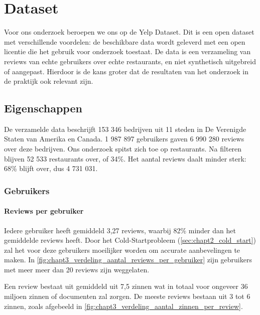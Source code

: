 \chapter{Dataset}

Voor ons onderzoek beroepen we ons op de Yelp Dataset. Dit is een open dataset met verschillende voordelen: de beschikbare data wordt geleverd met een open licentie die het gebruik voor onderzoek toestaat. \cite{Yelp_Dataset} De data is een verzameling van reviews van echte gebruikers over echte restaurants, en niet synthetisch uitgebreid of aangepast. Hierdoor is de kans groter dat de resultaten van het onderzoek in de praktijk ook relevant zijn.

\section{Eigenschappen}
\label{sub:chapt3_eigenschappen_dataset}
De verzamelde data beschrijft 153 346 bedrijven uit 11 steden in De Verenigde Staten van Amerika en Canada. 1 987 897 gebruikers gaven 6 990 280 reviews over deze bedrijven. Ons onderzoek spitst zich toe op restaurants. Na filteren blijven 52 533 restaurants over, of 34\%. Het aantal reviews daalt minder sterk: 68\% blijft over, dus 4 731 031.

\subsection{Gebruikers}
\subsubsection{Reviews per gebruiker}
\label{sec:chapt3_reviews_per_gebruiker}
Iedere gebruiker heeft gemiddeld 3,27 reviews, waarbij 82\% minder dan het gemiddelde reviews heeft. Door het Cold-Startprobleem (\ref{sec:chapt2_cold_start}) zal het voor deze gebruikers moeilijker worden om accurate aanbevelingen te maken. In \autoref{fig:chapt3_verdeling_aantal_reviews_per_gebruiker} zijn gebruikers met meer meer dan 20 reviews zijn weggelaten.

Een review bestaat uit gemiddeld uit 7,5 zinnen wat in totaal voor ongeveer 36 miljoen zinnen of documenten zal zorgen. De meeste reviews bestaan uit 3 tot 6 zinnen, zoals afgebeeld in \autoref{fig:chapt3_verdeling_aantal_zinnen_per_review}.


